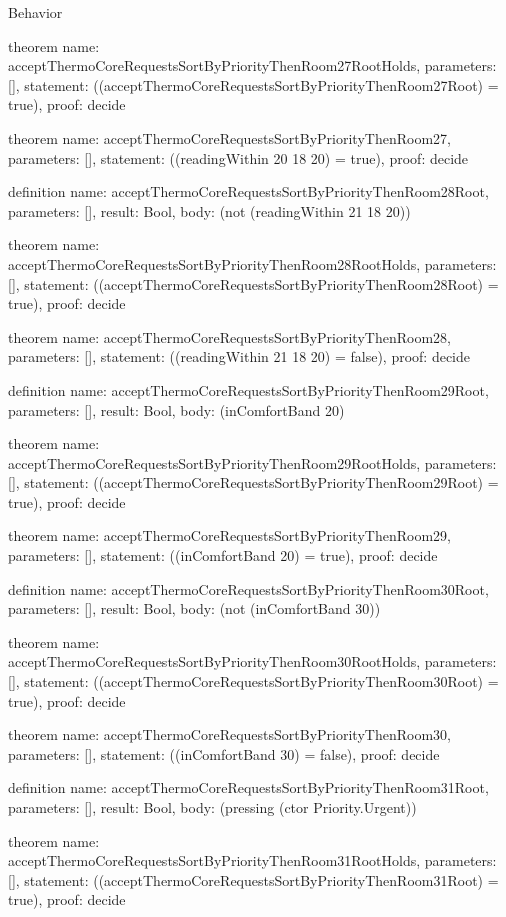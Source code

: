 \begin{lexlean}{Behavior}
\begin{semanticmodule}
theorem{
  name: acceptThermoCoreRequestsSortByPriorityThenRoom27RootHolds,
  parameters: [],
  statement: ((acceptThermoCoreRequestsSortByPriorityThenRoom27Root) = true),
  proof: decide{}
}

theorem{
  name: acceptThermoCoreRequestsSortByPriorityThenRoom27,
  parameters: [],
  statement: ((readingWithin 20 18 20) = true),
  proof: decide{}
}

definition{
  name: acceptThermoCoreRequestsSortByPriorityThenRoom28Root,
  parameters: [],
  result: Bool,
  body: (not (readingWithin 21 18 20))
}

theorem{
  name: acceptThermoCoreRequestsSortByPriorityThenRoom28RootHolds,
  parameters: [],
  statement: ((acceptThermoCoreRequestsSortByPriorityThenRoom28Root) = true),
  proof: decide{}
}

theorem{
  name: acceptThermoCoreRequestsSortByPriorityThenRoom28,
  parameters: [],
  statement: ((readingWithin 21 18 20) = false),
  proof: decide{}
}

definition{
  name: acceptThermoCoreRequestsSortByPriorityThenRoom29Root,
  parameters: [],
  result: Bool,
  body: (inComfortBand 20)
}

theorem{
  name: acceptThermoCoreRequestsSortByPriorityThenRoom29RootHolds,
  parameters: [],
  statement: ((acceptThermoCoreRequestsSortByPriorityThenRoom29Root) = true),
  proof: decide{}
}

theorem{
  name: acceptThermoCoreRequestsSortByPriorityThenRoom29,
  parameters: [],
  statement: ((inComfortBand 20) = true),
  proof: decide{}
}

definition{
  name: acceptThermoCoreRequestsSortByPriorityThenRoom30Root,
  parameters: [],
  result: Bool,
  body: (not (inComfortBand 30))
}

theorem{
  name: acceptThermoCoreRequestsSortByPriorityThenRoom30RootHolds,
  parameters: [],
  statement: ((acceptThermoCoreRequestsSortByPriorityThenRoom30Root) = true),
  proof: decide{}
}

theorem{
  name: acceptThermoCoreRequestsSortByPriorityThenRoom30,
  parameters: [],
  statement: ((inComfortBand 30) = false),
  proof: decide{}
}

definition{
  name: acceptThermoCoreRequestsSortByPriorityThenRoom31Root,
  parameters: [],
  result: Bool,
  body: (pressing (ctor Priority.Urgent))
}

theorem{
  name: acceptThermoCoreRequestsSortByPriorityThenRoom31RootHolds,
  parameters: [],
  statement: ((acceptThermoCoreRequestsSortByPriorityThenRoom31Root) = true),
  proof: decide{}
}


\end{semanticmodule}
\end{lexlean}
